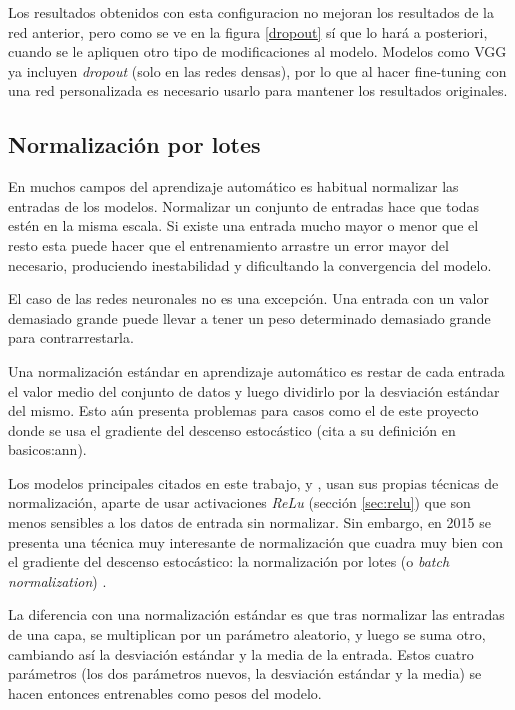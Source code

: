 Los resultados obtenidos con esta configuracion no mejoran los resultados de la red anterior, pero como se ve en la figura \ref{dropout} sí que lo hará a posteriori, cuando se le apliquen otro tipo de modificaciones al modelo. Modelos como VGG ya incluyen \textit{dropout} (solo en las redes densas), por lo que al hacer fine-tuning con una red personalizada es necesario usarlo para mantener los resultados originales.

\subsection{Normalización por lotes}

En muchos campos del aprendizaje automático es habitual normalizar las entradas de los modelos. Normalizar un conjunto de entradas hace que todas estén en la misma escala. Si existe una entrada mucho mayor o menor que el resto esta puede hacer que el entrenamiento arrastre un error mayor del necesario, produciendo inestabilidad y dificultando la convergencia del modelo.

El caso de las redes neuronales no es una excepción. Una entrada con un valor demasiado grande puede llevar a tener un peso determinado demasiado grande para contrarrestarla.

Una normalización estándar en aprendizaje automático es restar de cada entrada el valor medio del conjunto de datos y luego dividirlo por la desviación estándar del mismo. Esto aún presenta problemas para casos como el de este proyecto donde se usa el gradiente del descenso estocástico (cita a su definición en basicos:ann).

Los modelos principales citados en este trabajo, \parencite{krizhevsky2012imagenet} y \parencite{simonyan}, usan sus propias técnicas de normalización, aparte de usar activaciones \textit{ReLu} (sección \ref{sec:relu}) que son menos sensibles a los datos de entrada sin normalizar. Sin embargo, en 2015 se presenta una técnica muy interesante de normalización que cuadra muy bien con el gradiente del descenso estocástico: la normalización por lotes (o \textit{batch normalization}) \parencite{batch_normalization}.

La diferencia con una normalización estándar es que tras normalizar las entradas de una capa, se multiplican por un parámetro aleatorio, y luego se suma otro, cambiando así la desviación estándar y la media de la entrada. Estos cuatro parámetros (los dos parámetros nuevos, la desviación estándar y la media) se hacen entonces entrenables como pesos del modelo.

